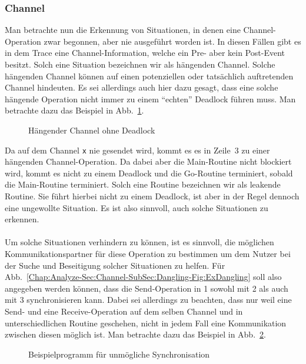 \subsubsection{Channel}\label{Chap:Theo-Sec:Analyze-SubSec:Channel}
Man betrachte nun die Erkennung von Situationen, in denen eine Channel-Operation
zwar begonnen, aber nie ausgeführt worden ist. 
In diesen Fällen gibt es in dem Trace eine Channel-Information, 
welche ein Pre- aber kein Post-Event besitzt. Solch eine Situation bezeichnen wir als hängenden Channel. 
Solche hängenden 
Channel können auf einen potenziellen oder tatsächlich auftretenden Channel hindeuten.
Es sei allerdings auch hier dazu gesagt, dass eine solche hängende Operation nicht 
immer zu einem ``echten'' Deadlock führen muss.
Man betrachte dazu das Beispiel in Abb.~\ref{Chap:Analyze-Sec:Channel-SubSec:Dangling-Fig:ExDanglingWithout}.
\begin{figure}[h!]
  
  \caption{Hängender Channel ohne Deadlock}
  \label{Chap:Analyze-Sec:Channel-SubSec:Dangling-Fig:ExDanglingWithout}
\end{figure}
Da auf dem Channel \texttt{x} nie gesendet wird, kommt es es in Zeile~3 zu einer hängenden Channel-Operation. Da 
dabei aber die Main-Routine nicht blockiert wird, kommt es nicht zu einem Deadlock und die Go-Routine 
terminiert, sobald die Main-Routine terminiert. Solch eine Routine bezeichnen wir als leakende Routine.
Sie führt hierbei nicht zu einem Deadlock, ist aber in der Regel dennoch eine ungewollte Situation.
Es ist also sinnvoll, auch solche Situationen zu erkennen.\\\\
Um solche Situationen verhindern 
zu können, ist es sinnvoll, die möglichen Kommunikationspartner für diese 
Operation zu bestimmen um dem Nutzer bei der Suche und Beseitigung 
solcher Situationen zu helfen. Für Abb.~\ref{Chap:Analyze-Sec:Channel-SubSec:Dangling-Fig:ExDangling}
soll also angegeben werden können, dass die Send-Operation in 1 sowohl mit 2 als auch mit 3 
synchronisieren kann. Dabei sei allerdings zu beachten, dass nur weil eine Send- und eine 
Receive-Operation auf dem selben Channel und in unterschiedlichen Routine geschehen, nicht 
in jedem Fall eine Kommunikation zwischen diesen möglich ist. Man betrachte dazu das Beispiel in 
Abb.~\ref{Chap:Analyze-Sec:Channel-SubSec:Dangling-Fig:NoSync}.
\begin{figure}[h!]
  
  \caption{Beispielprogramm für unmögliche Synchronisation}
  \label{Chap:Analyze-Sec:Channel-SubSec:Dangling-Fig:NoSync}
\end{figure}
